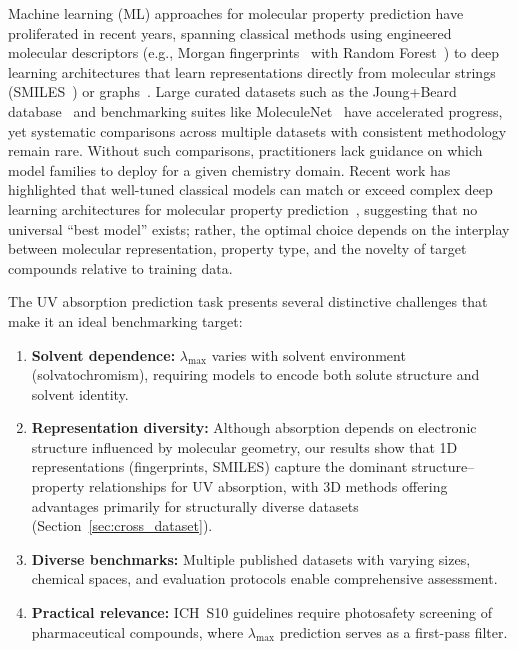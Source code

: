 \documentclass[11pt,a4paper]{article}
\begin{document}
Machine learning (ML) approaches for molecular property prediction have proliferated in recent years, spanning classical methods using engineered molecular descriptors (e.g., Morgan fingerprints~\cite{rogers2010extended} with Random Forest~\cite{breiman2001random}) to deep learning architectures that learn representations directly from molecular strings (SMILES~\cite{weininger1988smiles}) or graphs~\cite{gilmer2017neural}.
Large curated datasets such as the Joung+Beard database~\cite{joung2020experimental, beard2019comparative} and benchmarking suites like MoleculeNet~\cite{wuMoleculeNet2018} have accelerated progress, yet systematic comparisons across multiple datasets with consistent methodology remain rare. Without such comparisons, practitioners lack guidance on which model families to deploy for a given chemistry domain.
Recent work has highlighted that well-tuned classical models can match or exceed complex deep learning architectures for molecular property prediction~\cite{panapitiya2022evaluation, walters2021applications, fooladi2025evaluating}, suggesting that no universal ``best model'' exists; rather, the optimal choice depends on the interplay between molecular representation, property type, and the novelty of target compounds relative to training data.

The UV absorption prediction task presents several distinctive challenges that make it an ideal benchmarking target:
\begin{enumerate}
    \item \textbf{Solvent dependence:} $\lambda_{\max}$ varies with solvent environment (solvatochromism), requiring models to encode both solute structure and solvent identity.
    \item \textbf{Representation diversity:} Although absorption depends on electronic structure influenced by molecular geometry, our results show that 1D representations (fingerprints, SMILES) capture the dominant structure--property relationships for UV absorption, with 3D methods offering advantages primarily for structurally diverse datasets (Section~\ref{sec:cross_dataset}).
    \item \textbf{Diverse benchmarks:} Multiple published datasets with varying sizes, chemical spaces, and evaluation protocols enable comprehensive assessment.
    \item \textbf{Practical relevance:} ICH~S10 guidelines require photosafety screening of pharmaceutical compounds, where $\lambda_{\max}$ prediction serves as a first-pass filter.
\end{enumerate}
\end{document}
